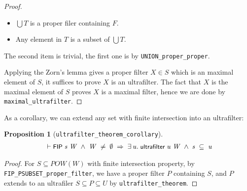 \documentclass[letterpaper]{article}
\newtheorem{prop}{Proposition}
\renewcommand{\HOLConst}[1]{{\textsf{\upshape\small #1}}}
\newenvironment{holmath}{\begin{displaymath}\begin{array}{l}}{\end{array}\end{displaymath}\ignorespacesafterend}
\begin{document}
\begin{proof}
\begin{itemize}
  \item $\bigcup T$ is a proper filer containing $F$.
  \item Any element in $T$ is a subset of $\bigcup T$.
\end{itemize}
  The second item is trivial, the first one is by \texttt{UNION_proper_proper}.

Applying the Zorn's lemma gives a proper filter $X\in S$ which is an maximal element of $S$, it suffices to prove $X$ is an ultrafilter. The fact that $X$ is the maximal element of $S$ proves $X$ is a maximal filter, hence we are done by \texttt{maximal_ultrafilter}.
\end{proof}

As a corollary, we can extend any set with finite intersection into an ultrafilter:

\begin{prop}[\texttt{ultrafilter_theorem_corollary}]
\begin{holmath}
  \ensuremath{\HOLTokenTurnstile}\HOLConst{FIP}\;\HOLFreeVar{s}\;\HOLFreeVar{W}\;\HOLSymConst{\HOLTokenConj{}}\;\HOLFreeVar{W}\;\HOLSymConst{\HOLTokenNotEqual{}}\;\HOLSymConst{\HOLTokenEmpty{}}\;\HOLSymConst{\HOLTokenImp{}}\;\HOLSymConst{\HOLTokenExists{}}\HOLBoundVar{u}.\;\HOLConst{ultrafilter}\;\HOLBoundVar{u}\;\HOLFreeVar{W}\;\HOLSymConst{\HOLTokenConj{}}\;\HOLFreeVar{s}\;\HOLSymConst{\HOLTokenSubset{}}\;\HOLBoundVar{u}
\end{holmath}
\end{prop}

\begin{proof}
For $S\subseteq POW(W)$ with finite intersection property, by \texttt{FIP_PSUBSET_proper_filter}, we have a proper filter $P$ containing $S$, and $P$ extends to an ultrafiler $S\subseteq P\subseteq U$ by \texttt{ultrafilter_theorem}.
\end{proof}
\end{document}
